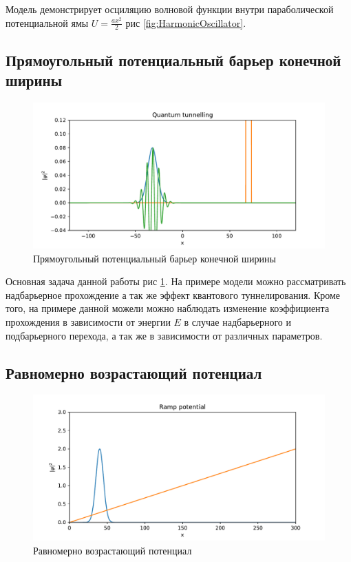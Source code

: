 \documentclass[a4paper, 12pt]{article}
\begin{document}
    Модель демонстрирует осциляцию волновой функции внутри параболической потенциальной ямы 
    $\displaystyle U = \frac{a  x^2}{2}$ рис \ref{fig:HarmonicOscillator}.
    
    \subsection{Прямоугольный потенциальный барьер конечной ширины}

    \begin{figure}
        \centering
        \includegraphics[scale=0.5]{images/QuantumTunnelling.pdf}
        \caption{Прямоугольный потенциальный барьер конечной ширины}
        \label{fig:QuantumTunnelling}
    \end{figure}

    Основная задача данной работы рис \ref{fig:QuantumTunnelling}. На примере модели можно рассматривать надбарьерное
    прохождение а так же эффект квантового туннелирования. Кроме того, на примере данной можели можно наблюдать
    изменение коэффициента прохождения в зависимости от энергии $E$ в случае надбарьерного и подбарьерного перехода,
    а так же в зависимости от различных параметров.
    
    \subsection{Равномерно возрастающий потенциал}

    \begin{figure}
        \centering
        \includegraphics[scale=0.5]{images/RampPotential.pdf}
        \caption{Равномерно возрастающий потенциал}
        \label{fig:RampPotential}
    \end{figure}
\end{document}
